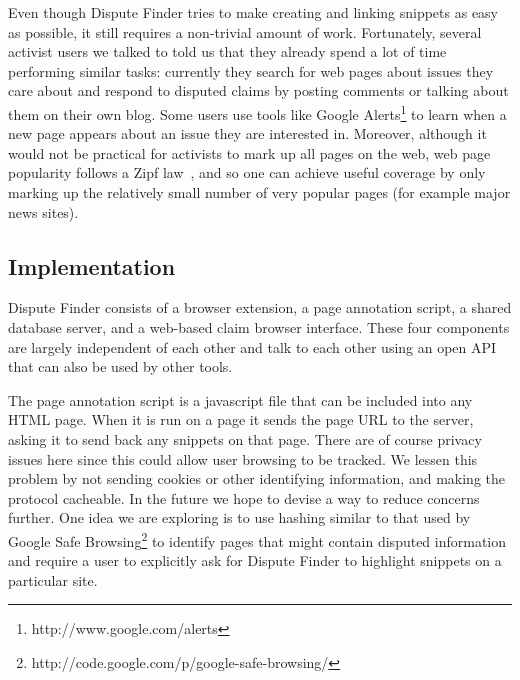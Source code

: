 \documentclass{www2010-submission}
\newcommand{\todo}[1]{}
\begin{document}
\todo{Talk about previewing a topic by showing wikipedia page}

Even though Dispute Finder tries to make creating and linking snippets as easy as possible, it still requires a non-trivial amount of work. Fortunately, several activist users we talked to told us that they already spend a lot of time performing similar tasks: currently they search for web pages about issues they care about and respond to disputed claims by posting comments or talking about them on their own blog. Some users use tools like Google Alerts\footnote{http://www.google.com/alerts} to learn when a new page appears about an issue they are interested in. Moreover, although it would not be practical for activists to mark up all pages on the web, web page popularity follows a Zipf law~\cite{Krashakov2006}, and so one can achieve useful coverage by only marking up the relatively small number of very popular pages (for example major news sites).

\todo{Mention about topic previewing}

\todo{Allow two claims to be marked as being identical.}

\todo{BUG: don't have 'add' button for snippets}


\subsection{Implementation}

Dispute Finder consists of a browser extension, a page annotation script, a shared database server, and a web-based claim browser interface. These four components are largely independent of each other and talk to each other using an open API that can also be used by other tools. 

The page annotation script is a javascript file that can be included into any HTML page. When it is run on a page it sends the page URL to the server, asking it to send back any snippets on that page. There are of course privacy issues here since this could allow user browsing to be tracked. We lessen this problem by not sending cookies or other identifying information, and making the protocol cacheable. 
In the future we hope to devise a way to reduce concerns further. 
One idea we are exploring is to use hashing similar to that used by Google Safe Browsing\footnote{http://code.google.com/p/google-safe-browsing/} to identify pages that might contain disputed information and require a user to explicitly ask for Dispute Finder to highlight snippets on a particular site.
\end{document}

